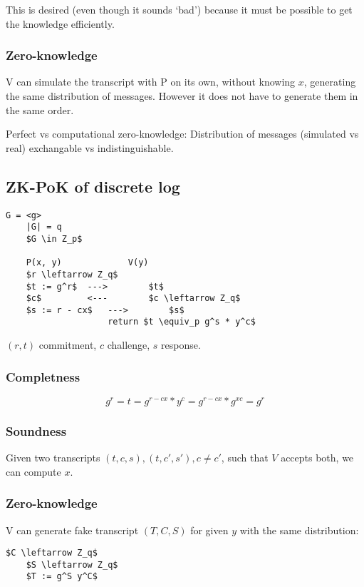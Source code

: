 \documentclass[a4paper]{scrreprt}
\begin{document}
This is desired (even though it sounds `bad') because it must be possible to
get the knowledge efficiently.


\subsubsection{Zero-knowledge}

V can simulate the transcript with P on its own, without knowing $x$,
generating the same distribution of messages. However it does not have to
generate them in the same order.

Perfect vs computational zero-knowledge: Distribution of messages (simulated vs
real) exchangable vs indistinguishable.

\subsection{ZK-PoK of discrete log}

\begin{lstlisting}[mathescape=true,autogobble=true]
	G = <g>
	|G| = q
	$G \in Z_p$

	P(x, y)				V(y)
	$r \leftarrow Z_q$
	$t := g^r$ 	--->		$t$
	$c$      	<---		$c \leftarrow Z_q$
	$s := r - cx$	--->		$s$
					return $t \equiv_p g^s * y^c$
\end{lstlisting}

$(r, t)$ commitment, $c$ challenge, $s$ response.

\subsubsection{Completness}

\[
	g^r = t = g^{r - cx} * y^c = g^{r - cx} * g^{xc} = g^r
\]

\subsubsection{Soundness}

Given two transcripts $(t, c, s), (t, c', s'), c \neq c'$, such that $V$
accepts both, we can compute $x$.

\subsubsection{Zero-knowledge}

V can generate fake transcript $(T, C, S)$ for given $y$ with the same
distribution:

\begin{lstlisting}[mathescape=true,autogobble=true]
	$C \leftarrow Z_q$
	$S \leftarrow Z_q$
	$T := g^S y^C$
\end{lstlisting}
\end{document}
